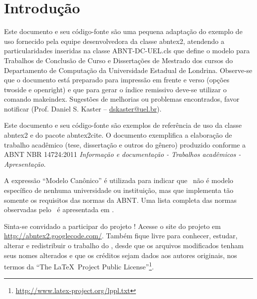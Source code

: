\documentclass[
	12pt,				%
	openright,			%
	twoside,			%
	a4paper,			%
	tcc,			%
]{cct-uenp}
\begin{document}
\tableofcontents*
\cleardoublepage



\textual
\pagestyle{uenp-header} %


\chapter{Introdução}

Este documento e seu código-fonte são uma pequena adaptação do exemplo de uso
fornecido pela equipe desenvolvedora da classe \textsf{abntex2}, atendendo a
particularidades inseridas na classe \textsf{ABNT-DC-UEL.cls} que define
o modelo para Trabalhos de Conclusão de Curso e Dissertações de Mestrado dos
cursos do Departamento de Computação da Universidade Estadual de Londrina.
Observe-se que o documento está preparado para impressão em frente e verso
(opções twoside e openright) e que para gerar o índice remissivo deve-se 
utilizar o comando \textsf{makeindex}.
Sugestões de melhorias ou problemas encontrados, favor notificar (Prof.
Daniel S. Kaster -- \href{mailto:dskaster@uel.br}{dskaster@uel.br}).

Este documento e seu código-fonte são exemplos de referência de uso da classe
\textsf{abntex2} e do pacote \textsf{abntex2cite}. O documento 
exemplifica a elaboração de trabalho acadêmico (tese, dissertação e outros do
gênero) produzido conforme a ABNT NBR 14724:2011 \emph{Informação e documentação
- Trabalhos acadêmicos - Apresentação}.

A expressão ``Modelo Canônico'' é utilizada para indicar que \abnTeX\ não é
modelo específico de nenhuma universidade ou instituição, mas que implementa tão
somente os requisitos das normas da ABNT. Uma lista completa das normas
observadas pelo \abnTeX\ é apresentada em .

Sinta-se convidado a participar do projeto \abnTeX! Acesse o site do projeto em
\url{http://abntex2.googlecode.com/}. Também fique livre para conhecer,
estudar, alterar e redistribuir o trabalho do \abnTeX, desde que os arquivos
modificados tenham seus nomes alterados e que os créditos sejam dados aos
autores originais, nos termos da ``The \LaTeX\ Project Public
License''\footnote{\url{http://www.latex-project.org/lppl.txt}}.
\end{document}
